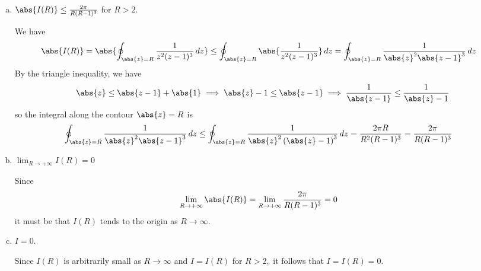 \documentclass{article}
\begin{document}
\begin{itemize}
\begin{enumerate}[(a)]
			\item $\abs{I(R)}\le \frac{2\pi}{R(R-1)^3}$ for $R>2.$
				\begin{answer*}
					We have
					\begin{align*}
						\abs{I(R)} &= \abs{\oint_{\abs{z}=R} \frac{1}{z^2(z-1)^3}\, dz} \le \oint_{\abs{z}=R} \abs{\frac{1}{z^2(z-1)^3}}\, dz = \oint_{\abs{z}=R} \frac{1}{\abs{z}^2 \abs{z-1}^3}\, dz
					\end{align*}
					By the triangle inequality, we have
					\begin{align*}
						\abs{z}\le \abs{z-1}+\abs{1} \implies \abs{z}-1\le \abs{z-1} \implies \frac{1}{\abs{z-1}} \le \frac{1}{\abs{z}-1}
					\end{align*}
					so the integral along the contour $\abs{z}=R$ is
					\begin{align*}
						\oint_{\abs{z}=R} \frac{1}{\abs{z}^2\abs{z-1}^3}\, dz &\le \oint_{\abs{z}=R} \frac{1}{\abs{z}^2\left( \abs{z}-1 \right)^3}\, dz = \frac{2\pi R}{R^2(R-1)^3} = \frac{2\pi}{R(R-1)^3}
					\end{align*}
				\end{answer*}

			\item $\lim_{R\to+\infty} I(R)=0$
				\begin{answer*}
					Since
					\begin{align*}
						\lim_{R\to+\infty} \abs{I(R)} &= \lim_{R\to+\infty} \frac{2\pi}{R(R-1)^3} = 0
					\end{align*} 
					it must be that $I(R)$ tends to the origin as $R\to \infty.$
				\end{answer*}

			\item $I=0.$
				\begin{answer*}
					Since $I(R)$ is arbitrarily small as $R\to \infty$ and $I=I(R)$ for $R>2,$ it follows that $I=I(R)=0.$
				\end{answer*}
				
		\end{enumerate}


\end{itemize}
\end{document}

